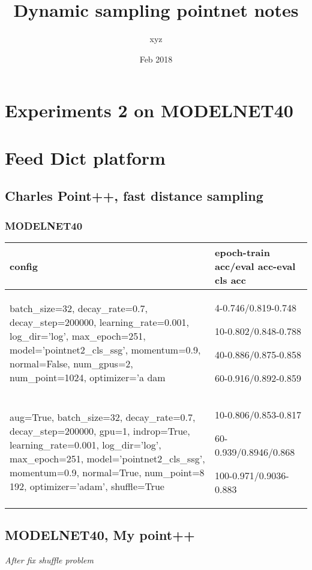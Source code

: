 \documentclass[,table,dvipsnames]{article}
\title{Dynamic sampling pointnet notes}
\author{xyz}
\date{Feb 2018}
\begin{document}
	\noindent
	\begin{titlepage}
		\maketitle
	\end{titlepage}	
	
	\tableofcontents{}
	\section{Experiments 2 on MODELNET40}

\section{Feed Dict platform}
\subsection{Charles Point++, fast distance sampling}	
\subsubsection{MODELNET40}
\begin{tabular}{ |p{8cm}|p{5cm}| }
	\hline
	config & epoch-train acc/eval acc-eval cls acc \\ 
	\hline
	batch\_size=32, decay\_rate=0.7, decay\_step=200000, learning\_rate=0.001, log\_dir='log', max\_epoch=251, model='pointnet2\_cls\_ssg', momentum=0.9, normal=False, num\_gpus=2, num\_point=1024, optimizer='a     dam &4-0.746/0.819-0.748\par 10-0.802/0.848-0.788\par 40-0.886/0.875-0.858\par 60-0.916/0.892-0.859 \\
	\hline
	aug=True, batch\_size=32, decay\_rate=0.7, decay\_step=200000, gpu=1, indrop=True, learning\_rate=0.001, log\_dir='log', max\_epoch=251, model='pointnet2\_cls\_ssg', momentum=0.9, normal=True, num\_point=8     192, optimizer='adam', shuffle=True & 10-0.806/0.853-0.817 \par  60-0.939/0.8946/0.868 \par 100-0.971/0.9036-0.883\\
	\hline
	
\end{tabular}
\noindent
\subsection{MODELNET40, My point++}	
\emph{After fix shuffle problem}
\end{document}
